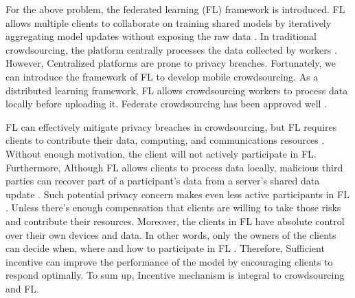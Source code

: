 \documentclass[final,1p,times]{elsarticle}
\begin{document}
For the above problem, the federated learning (FL) \citep{mcmahan2017communication} framework is introduced. FL allows multiple clients to collaborate on training shared models by iteratively aggregating model updates without exposing the raw data \citep{wan2020federated,gao2022survey}. In traditional crowdsourcing, the platform centrally processes the data collected by workers \citep{yu2020active,tu2020multi,wu2021multi,zhang2022active}. However, Centralized platforms are prone to privacy breaches. Fortunately, we can introduce the framework of FL to develop mobile crowdsourcing. As a distributed learning framework, FL allows crowdsourcing workers to process data locally before uploading it. Federate crowdsourcing has been approved well \citep{li2020crowdsfl,ciftler2020federated,zhang2021enabling}.

FL can effectively mitigate privacy breaches in crowdsourcing, but FL requires clients to contribute their data, computing, and communications resources \citep{zhan2021incentive}. Without enough motivation, the client will not actively participate in FL. Furthermore, Although FL allows clients to process data locally, malicious third parties can recover part of a participant's data from a server's shared data update \citep{lyu2020threats,suri2022subject}. Such potential privacy concern makes even less active participants in FL \citep{mothukuri2021survey}. Unless there's enough compensation that clients are willing to take those risks and contribute their resources. Moreover, the clients in FL have absolute control over their own devices and data\citep{liu2022distributed}. In other words, only the owners of the clients can decide when, where and how to participate in FL \citep{li2020review}. Therefore, Sufficient incentive can improve the performance of the model by encouraging clients to respond optimally. To sum up, Incentive mechanism is integral to crowdsourcing and FL.
\end{document}
